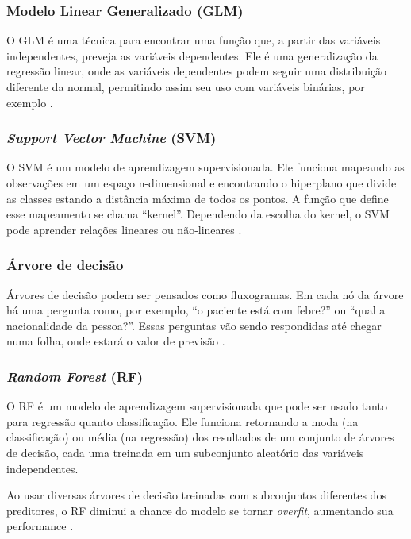 \documentclass[a4paper,titlepage]{ppgi}\usepackage[]{graphicx}\usepackage[]{color}
\begin{document}
\subsubsection{Modelo Linear Generalizado (GLM)}

O \gls{GLM} é uma técnica para encontrar uma função que, a partir das variáveis
independentes, preveja as variáveis dependentes. Ele é uma generalização da
regressão linear, onde as variáveis dependentes podem seguir uma
distribuição diferente da normal, permitindo assim seu uso com variáveis
binárias, por exemplo \cite{Kuhn2013}.

\subsubsection{\emph{Support Vector Machine} (SVM)}

O \gls{SVM} é um modelo de aprendizagem supervisionada. Ele funciona mapeando
as observações em um espaço n-dimensional e encontrando o hiperplano que divide
as classes estando a distância máxima de todos os pontos. A função que define
esse mapeamento se chama ``kernel''. Dependendo da escolha do kernel, o
\gls{SVM} pode aprender relações lineares ou não-lineares \cite{Kuhn2013}.

\subsubsection{Árvore de decisão}

Árvores de decisão podem ser pensados como fluxogramas. Em cada nó da árvore há
uma pergunta como, por exemplo, ``o paciente está com febre?'' ou ``qual a
nacionalidade da pessoa?''. Essas perguntas vão sendo respondidas até chegar
numa folha, onde estará o valor de previsão \cite{Kuhn2013}.

\subsubsection{\emph{Random Forest} (RF)}

O \gls{RF} é um modelo de aprendizagem supervisionada que pode ser usado tanto
para regressão quanto classificação. Ele funciona retornando a moda (na
classificação) ou média (na regressão) dos resultados de um conjunto de
árvores de decisão, cada uma treinada em um subconjunto aleatório das variáveis
independentes.

Ao usar diversas árvores de decisão treinadas com subconjuntos diferentes dos
preditores, o \gls{RF} diminui a chance do modelo se tornar \emph{overfit},
aumentando sua performance \cite{Kuhn2013}.
\end{document}
